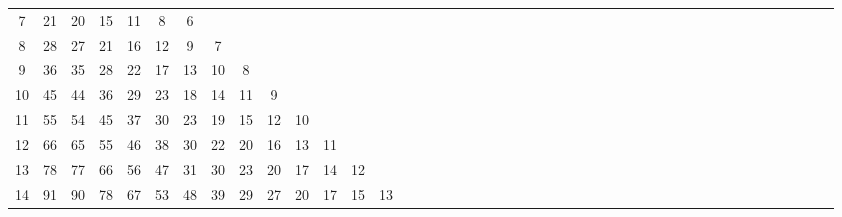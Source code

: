\documentclass[12pt,a4paper]{amsart}
\theoremstyle{definition} %
\theoremstyle{plain} %
\begin{document}
\begin{table}[h]
{\begin{tabular}{|c|*{44}{c|}}
            7 &  21 &  20 &  15 &  11 &   8 &   6 &     &     &     &      &      &      &      &      &      &      &      &      &      &      &      &      &      &      &      &      &      &      &      &      &      &      &      &      &      &      &      &      &      &      &      &      &      &      \\
            8 &  28 &  27 &  21 &  16 &  12 &   9 &   7 &     &     &      &      &      &      &      &      &      &      &      &      &      &      &      &      &      &      &      &      &      &      &      &      &      &      &      &      &      &      &      &      &      &      &      &      &      \\
            9 &  36 &  35 &  28 &  22 &  17 &  13 &  10 &   8 &     &      &      &      &      &      &      &      &      &      &      &      &      &      &      &      &      &      &      &      &      &      &      &      &      &      &      &      &      &      &      &      &      &      &      &      \\
            10 &  45 &  44 &  36 &  29 &  23 &  18 &  14 &  11 &   9 &      &      &      &      &      &      &      &      &      &      &      &      &      &      &      &      &      &      &      &      &      &      &      &      &      &      &      &      &      &      &      &      &      &      &      \\
            11 &  55 &  54 &  45 &  37 &  30 &  23 &  19 &  15 &  12 &   10 &      &      &      &      &      &      &      &      &      &      &      &      &      &      &      &      &      &      &      &      &      &      &      &      &      &      &      &      &      &      &      &      &      &      \\
            12 &  66 &  65 &  55 &  46 &  38 &  30 &  22 &  20 &  16 &   13 &   11 &      &      &      &      &      &      &      &      &      &      &      &      &      &      &      &      &      &      &      &      &      &      &      &      &      &      &      &      &      &      &      &      &      \\
            13 &  78 &  77 &  66 &  56 &  47 &  31 &  30 &  23 &  20 &   17 &   14 &   12 &      &      &      &      &      &      &      &      &      &      &      &      &      &      &      &      &      &      &      &      &      &      &      &      &      &      &      &      &      &      &      &      \\
            14 &  91 &  90 &  78 &  67 &  53 &  48 &  39 &  29 &  27 &   20 &   17 &   15 &   13 &      &      &      &      &      &      &      &      &      &      &      &      &      &      &      &      &      &      &      &      &      &      &      &      &      &      &      &      &      &      &      \\

\end{tabular}}
\end{table}
\end{document}
